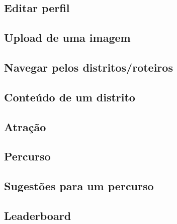\documentclass[
  oneside,
  11pt, a4paper,
  footinclude=true,
  headinclude=true,
  cleardoublepage=empty
]{scrbook}
\begin{document}
    \subsection{Editar perfil}
    
    
    \newpage
    
    \subsection{Upload de uma imagem}
    
    
    \newpage
    
    \subsection{Navegar pelos distritos/roteiros}
    
    
    \newpage
    
    \subsection{Conteúdo de um distrito}
    
    
    \newpage
    
    \subsection{Atração}
    
    
    \newpage
    
    \subsection{Percurso}
    
    
    \newpage
    
    \subsection{Sugestões para um percurso}
    
    
    \newpage
    
    \subsection{Leaderboard}
    
    
\end{document}
